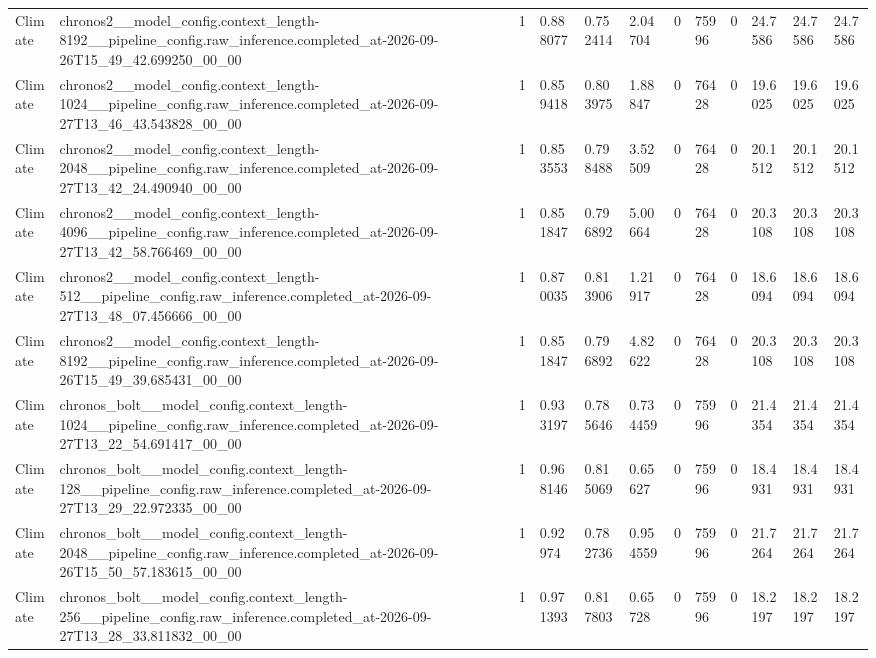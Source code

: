 \begin{tabular}{llllllllllll}
Climate & chronos2\_\_model\_config.context\_length-8192\_\_pipeline\_config.raw\_inference.completed\_at-2026-09-26T15\_49\_42.699250\_00\_00 & 1 & 0.888077 & 0.752414 & 2.04704 & 0 & 75996 & 0 & 24.7586 & 24.7586 & 24.7586 \\
Climate & chronos2\_\_model\_config.context\_length-1024\_\_pipeline\_config.raw\_inference.completed\_at-2026-09-27T13\_46\_43.543828\_00\_00 & 1 & 0.859418 & 0.803975 & 1.88847 & 0 & 76428 & 0 & 19.6025 & 19.6025 & 19.6025 \\
Climate & chronos2\_\_model\_config.context\_length-2048\_\_pipeline\_config.raw\_inference.completed\_at-2026-09-27T13\_42\_24.490940\_00\_00 & 1 & 0.853553 & 0.798488 & 3.52509 & 0 & 76428 & 0 & 20.1512 & 20.1512 & 20.1512 \\
Climate & chronos2\_\_model\_config.context\_length-4096\_\_pipeline\_config.raw\_inference.completed\_at-2026-09-27T13\_42\_58.766469\_00\_00 & 1 & 0.851847 & 0.796892 & 5.00664 & 0 & 76428 & 0 & 20.3108 & 20.3108 & 20.3108 \\
Climate & chronos2\_\_model\_config.context\_length-512\_\_pipeline\_config.raw\_inference.completed\_at-2026-09-27T13\_48\_07.456666\_00\_00 & 1 & 0.870035 & 0.813906 & 1.21917 & 0 & 76428 & 0 & 18.6094 & 18.6094 & 18.6094 \\
Climate & chronos2\_\_model\_config.context\_length-8192\_\_pipeline\_config.raw\_inference.completed\_at-2026-09-26T15\_49\_39.685431\_00\_00 & 1 & 0.851847 & 0.796892 & 4.82622 & 0 & 76428 & 0 & 20.3108 & 20.3108 & 20.3108 \\
Climate & chronos\_bolt\_\_model\_config.context\_length-1024\_\_pipeline\_config.raw\_inference.completed\_at-2026-09-27T13\_22\_54.691417\_00\_00 & 1 & 0.933197 & 0.785646 & 0.734459 & 0 & 75996 & 0 & 21.4354 & 21.4354 & 21.4354 \\
Climate & chronos\_bolt\_\_model\_config.context\_length-128\_\_pipeline\_config.raw\_inference.completed\_at-2026-09-27T13\_29\_22.972335\_00\_00 & 1 & 0.968146 & 0.815069 & 0.65627 & 0 & 75996 & 0 & 18.4931 & 18.4931 & 18.4931 \\
Climate & chronos\_bolt\_\_model\_config.context\_length-2048\_\_pipeline\_config.raw\_inference.completed\_at-2026-09-26T15\_50\_57.183615\_00\_00 & 1 & 0.92974 & 0.782736 & 0.954559 & 0 & 75996 & 0 & 21.7264 & 21.7264 & 21.7264 \\
Climate & chronos\_bolt\_\_model\_config.context\_length-256\_\_pipeline\_config.raw\_inference.completed\_at-2026-09-27T13\_28\_33.811832\_00\_00 & 1 & 0.971393 & 0.817803 & 0.65728 & 0 & 75996 & 0 & 18.2197 & 18.2197 & 18.2197 \\

\end{tabular}
